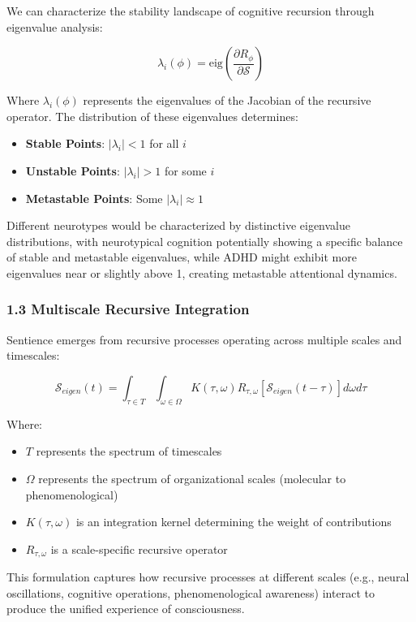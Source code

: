 \documentclass[
]{article}
\providecommand{\tightlist}{%
  \setlength{\itemsep}{0pt}\setlength{\parskip}{0pt}}
\begin{document}
We can characterize the stability landscape of cognitive recursion
through eigenvalue analysis:

\[\lambda_i(\phi) = \text{eig}\left(\frac{\partial R_{\phi}}{\partial \mathcal{S}}\right)\]

Where \(\lambda_i(\phi)\) represents the eigenvalues of the Jacobian of
the recursive operator. The distribution of these eigenvalues
determines:

\begin{itemize}
\tightlist
\item
  \textbf{Stable Points}: \(|\lambda_i| < 1\) for all \(i\)
\item
  \textbf{Unstable Points}: \(|\lambda_i| > 1\) for some \(i\)
\item
  \textbf{Metastable Points}: Some \(|\lambda_i| \approx 1\)
\end{itemize}

Different neurotypes would be characterized by distinctive eigenvalue
distributions, with neurotypical cognition potentially showing a
specific balance of stable and metastable eigenvalues, while ADHD might
exhibit more eigenvalues near or slightly above 1, creating metastable
attentional dynamics.

\subsubsection{1.3 Multiscale Recursive
Integration}\label{multiscale-recursive-integration}

Sentience emerges from recursive processes operating across multiple
scales and timescales:

\[\mathcal{S}_{eigen}(t) = \int_{\tau \in T} \int_{\omega \in \Omega} K(\tau, \omega) R_{\tau, \omega}[\mathcal{S}_{eigen}(t-\tau)] d\omega d\tau\]

Where:

\begin{itemize}
\tightlist
\item
  \(T\) represents the spectrum of timescales
\item
  \(\Omega\) represents the spectrum of organizational scales (molecular
  to phenomenological)
\item
  \(K(\tau, \omega)\) is an integration kernel determining the weight of
  contributions
\item
  \(R_{\tau, \omega}\) is a scale-specific recursive operator
\end{itemize}

This formulation captures how recursive processes at different scales
(e.g., neural oscillations, cognitive operations, phenomenological
awareness) interact to produce the unified experience of consciousness.
\end{document}
